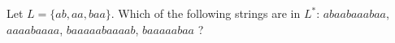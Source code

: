 Let $L = \{ab, aa, baa\}$. Which of the following strings are in $L^*$:
$abaabaaabaa$, $aaaabaaaa$, $baaaaabaaaab$, $baaaaabaa$ ?
